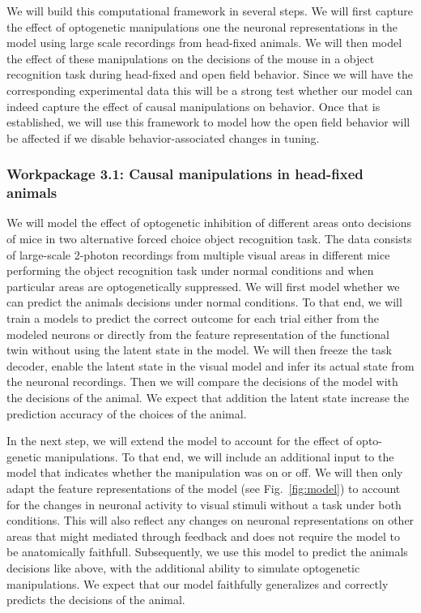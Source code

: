 \documentclass[B2,COG]{ercgrant}
\begin{document}
We will build this computational framework in several steps. 
We will first capture the effect of optogenetic manipulations one the neuronal representations in the model using large scale recordings from head-fixed animals. 
We will then model the effect of these manipulations on the decisions of the mouse in a object recognition task during head-fixed and open field behavior. 
Since we will have the corresponding experimental data this will be a strong test whether our model can indeed capture the effect of causal manipulations on behavior.
Once that is established, we will use this framework to model how the open field behavior will be affected if we disable behavior-associated changes in tuning.

\subsubsection{Workpackage 3.1: Causal manipulations in head-fixed animals\hfill{}}
We will model the effect of optogenetic inhibition of different areas onto decisions of mice in two alternative forced choice object recognition task. 
The data consists of large-scale 2-photon recordings from multiple visual areas in different mice performing the object recognition task under normal conditions and when particular areas are optogenetically suppressed.
We will first model whether we can predict the animals decisions under normal conditions. 
To that end, we will train a models to predict the correct outcome for each trial either from the modeled neurons or directly from the feature representation of the functional twin without using the  latent state in the model.
We will then freeze the task decoder, enable the latent state in the visual model and infer its actual state from the neuronal recordings. 
Then we will compare the decisions of the model with the decisions of the animal. 
We expect that addition the latent state increase the prediction accuracy of the choices of the animal. 

In the next step, we will extend the model to account for the effect of opto-genetic manipulations. 
To that end, we will include an additional input to the model that indicates whether the manipulation was on or off. 
We will then only adapt the feature representations of the model (see Fig.~\ref{fig:model}) to account for the changes in neuronal activity to visual stimuli without a task under both conditions.
This will also reflect any changes on neuronal representations on other areas that might mediated through feedback and does not require the model to be anatomically faithfull. 
Subsequently, we use this model to predict the animals decisions like above, with the additional ability to simulate optogenetic manipulations.
We expect that our model faithfully generalizes and correctly predicts the decisions of the animal. 
\end{document}
